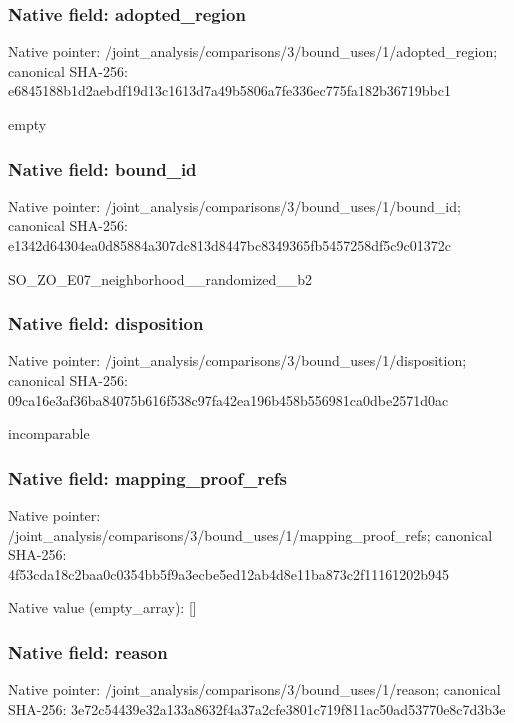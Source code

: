 \documentclass[10pt,a4paper]{article}
\begin{document}
\subsubsection{Native field: adopted\_\allowbreak{}region}
Native pointer: /joint\_\allowbreak{}analysis/comparisons/3/bound\_\allowbreak{}uses/1/adopted\_\allowbreak{}region; canonical SHA-256: e6845188b1d2aebdf19d13c1613d7a49b5806a7fe336ec775fa182b36719bbc1

\begingroup\raggedright\sloppy empty\par\endgroup

\subsubsection{Native field: bound\_\allowbreak{}id}
Native pointer: /joint\_\allowbreak{}analysis/comparisons/3/bound\_\allowbreak{}uses/1/bound\_\allowbreak{}id; canonical SHA-256: e1342d64304ea0d85884a307dc813d8447bc8349365fb5457258df5c9c01372c

\begingroup\raggedright\sloppy SO\_\allowbreak{}ZO\_\allowbreak{}E07\_\allowbreak{}neighborhood\_\allowbreak{}\_\allowbreak{}randomized\_\allowbreak{}\_\allowbreak{}b2\par\endgroup

\subsubsection{Native field: disposition}
Native pointer: /joint\_\allowbreak{}analysis/comparisons/3/bound\_\allowbreak{}uses/1/disposition; canonical SHA-256: 09ca16e3af36ba84075b616f538c97fa42ea196b458b556981ca0dbe2571d0ac

\begingroup\raggedright\sloppy incomparable\par\endgroup

\subsubsection{Native field: mapping\_\allowbreak{}proof\_\allowbreak{}refs}
Native pointer: /joint\_\allowbreak{}analysis/comparisons/3/bound\_\allowbreak{}uses/1/mapping\_\allowbreak{}proof\_\allowbreak{}refs; canonical SHA-256: 4f53cda18c2baa0c0354bb5f9a3ecbe5ed12ab4d8e11ba873c2f11161202b945

Native value (empty\_\allowbreak{}array): []

\subsubsection{Native field: reason}
Native pointer: /joint\_\allowbreak{}analysis/comparisons/3/bound\_\allowbreak{}uses/1/reason; canonical SHA-256: 3e72c54439e32a133a8632f4a37a2cfe3801c719f811ac50ad53770e8c7d3b3e
\end{document}
